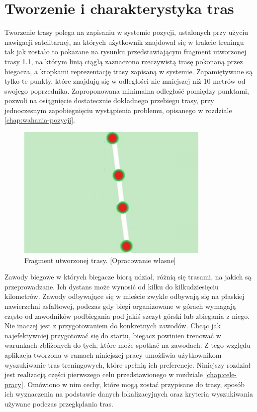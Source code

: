 \chapter{Tworzenie i charakterystyka tras}\label{chap:charakterystyka-tras}
Tworzenie trasy polega na zapisaniu w systemie pozycji, ustalonych przy użyciu nawigacji satelitarnej, na których użytkownik znajdował się w trakcie treningu tak jak zostało to pokazane na rysunku przedstawiającym fragment utworzonej trasy \ref{image:mapka_fragment_trasy}, na którym linią ciągłą zaznaczono rzeczywistą trasę pokonaną przez biegacza, a kropkami reprezentację trasy zapisaną w systemie. Zapamiętywane są tylko te punkty, które znajdują się w odległości nie mniejszej niż 10 metrów od swojego poprzednika. Zaproponowana minimalna odległość pomiędzy punktami, pozwoli na osiągnięcie dostatecznie dokładnego przebiegu trasy, przy jednoczesnym zapobiegnięciu wystąpienia problemu, opisanego w rozdziale \ref{chap:wahania-pozycji}.

\begin{figure}[h]\label{fig:miary}
\begin{center}
\includegraphics{img/mapka_fragment_trasy.png}
\caption{Fragment utworzonej trasy. [Opracowanie własne]}\label{image:mapka_fragment_trasy}
\end{center}
\end{figure}

Zawody biegowe w których biegacze biorą udział, różnią się trasami, na jakich są przeprowadzane. Ich dystans może wynosić od kilku do kilkudziesięciu kilometrów. Zawody odbywające się w mieście zwykle odbywają się na płaskiej nawierzchni asfaltowej, podczas gdy biegi organizowane w górach wymagają często od zawodników podbiegania pod jakiś szczyt górski lub zbiegania z niego. Nie inaczej jest z przygotowaniem do konkretnych zawodów. Chcąc jak najefektywniej przygotować się do startu, biegacz powinien trenować w warunkach zbliżonych do tych, które może spotkać na zawodach. Z tego względu aplikacja tworzona w ramach niniejszej pracy umożliwia użytkownikom wyszukiwanie tras treningowych, które spełnią ich preferencje. Niniejszy rozdział jest realizacją części pierwszego celu przedstawionego w rozdziale \ref{chap:cele-pracy}. Omówiono w nim cechy, które mogą zostać przypisane do trasy, sposób ich wyznaczenia na podstawie danych lokalizacyjnych oraz kryteria wyszukiwania używane podczas przeglądania tras. 

